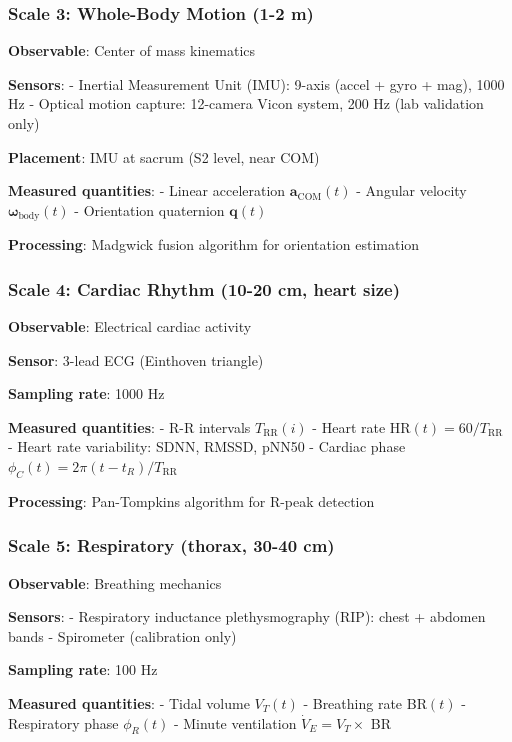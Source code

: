 \documentclass[11pt,onecolumn]{article}
\begin{document}
\subsubsection{Scale 3: Whole-Body Motion (1-2 m)}

\textbf{Observable}: Center of mass kinematics

\textbf{Sensors}:
- Inertial Measurement Unit (IMU): 9-axis (accel + gyro + mag), 1000 Hz
- Optical motion capture: 12-camera Vicon system, 200 Hz (lab validation only)

\textbf{Placement}: IMU at sacrum (S2 level, near COM)

\textbf{Measured quantities}:
- Linear acceleration $\mathbf{a}_{\text{COM}}(t)$
- Angular velocity $\boldsymbol{\omega}_{\text{body}}(t)$
- Orientation quaternion $\mathbf{q}(t)$

\textbf{Processing}: Madgwick fusion algorithm for orientation estimation

\subsubsection{Scale 4: Cardiac Rhythm (10-20 cm, heart size)}

\textbf{Observable}: Electrical cardiac activity

\textbf{Sensor}: 3-lead ECG (Einthoven triangle)

\textbf{Sampling rate}: 1000 Hz

\textbf{Measured quantities}:
- R-R intervals $T_{\text{RR}}(i)$
- Heart rate HR$(t) = 60/T_{\text{RR}}$
- Heart rate variability: SDNN, RMSSD, pNN50
- Cardiac phase $\phi_C(t) = 2\pi(t - t_R)/T_{\text{RR}}$

\textbf{Processing}: Pan-Tompkins algorithm for R-peak detection

\subsubsection{Scale 5: Respiratory (thorax, 30-40 cm)}

\textbf{Observable}: Breathing mechanics

\textbf{Sensors}:
- Respiratory inductance plethysmography (RIP): chest + abdomen bands
- Spirometer (calibration only)

\textbf{Sampling rate}: 100 Hz

\textbf{Measured quantities}:
- Tidal volume $V_T(t)$
- Breathing rate BR$(t)$
- Respiratory phase $\phi_R(t)$
- Minute ventilation $\dot{V}_E = V_T \times$ BR
\end{document}
